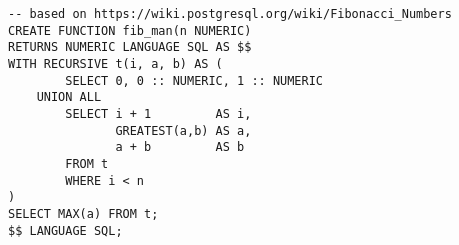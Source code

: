 \begin{verbatim}
-- based on https://wiki.postgresql.org/wiki/Fibonacci_Numbers
CREATE FUNCTION fib_man(n NUMERIC) 
RETURNS NUMERIC LANGUAGE SQL AS $$
WITH RECURSIVE t(i, a, b) AS (
        SELECT 0, 0 :: NUMERIC, 1 :: NUMERIC
    UNION ALL
        SELECT i + 1         AS i, 
               GREATEST(a,b) AS a,
        	   a + b         AS b 
        FROM t
        WHERE i < n
)
SELECT MAX(a) FROM t;
$$ LANGUAGE SQL;
\end{verbatim}